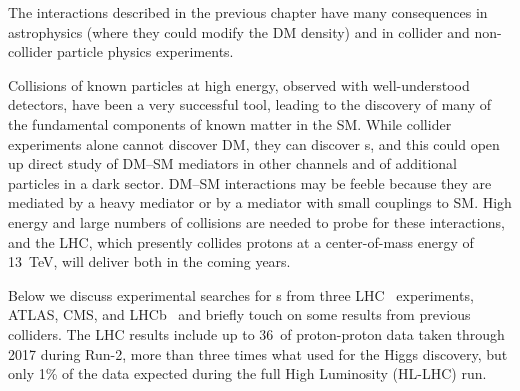 
The interactions described in the previous chapter have many consequences in astrophysics (where they could modify the DM density) and in collider and non-collider particle physics experiments.%

Collisions of known particles at high energy, observed with well-understood detectors, have been a very successful tool, leading to the discovery of many of the fundamental components of known matter in the SM. %
While collider experiments alone cannot discover DM, they can discover {\IP}s, and this could open up direct study of DM--SM mediators in other channels and of additional particles in a dark sector. %
DM--SM interactions may be feeble because they are mediated by a heavy mediator or by a mediator with small couplings to SM.
High energy and large numbers of collisions are needed to probe for these interactions, and the LHC, which presently collides protons at a center-of-mass energy of 13~TeV, will deliver both in the coming years. 

Below we discuss experimental searches for {\IP}s from three LHC~\cite{LHC2008} experiments, ATLAS, CMS, and LHCb~\cite{ATLAS2008,CMS2008,LHCb2008} and briefly touch on some results from previous colliders. %
The LHC results include up to 36~\ifb of proton-proton data taken through 2017 during Run-2, more than three times what used for the Higgs discovery, but only 1\% of the data expected during the full High Luminosity (HL-LHC) run.

